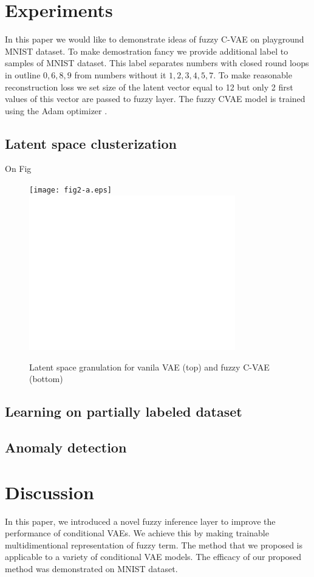 \documentclass[runningheads]{llncs}
\begin{document}
\section{Experiments}

In this paper we would like to demonstrate ideas of fuzzy C-VAE on playground MNIST dataset.
To make demostration fancy we provide additional label to samples of MNIST dataset.
This label separates numbers with closed round loops in outline $0,6,8,9$ from numbers without it $1,2,3,4,5,7$.
To make reasonable reconstruction loss we set size of the latent vector equal to 12 but only 2 first values of this vector are passed to fuzzy layer.
The fuzzy CVAE model is trained using the Adam optimizer \cite{kingma2017adam}.

\subsection{Latent space clusterization}

On Fig 

\begin{figure}[h]  
    \centering
    \texttt{[image: fig2-a.eps]}
    \includegraphics[width=0.8\textwidth]{fig2-b.eps}
    \caption{Latent space granulation for vanila VAE (top) and fuzzy C-VAE (bottom)}
    \label{fig:clustering}
\end{figure}
\subsection{Learning on partially labeled dataset}

\subsection{Anomaly detection}

\section{Discussion}

In this paper, we introduced a novel fuzzy inference layer to improve the performance of conditional VAEs. 
We achieve this by making trainable multidimentional representation of fuzzy term.
The method that we proposed is applicable to a variety of conditional VAE models. 
The efficacy of our proposed method was demonstrated on MNIST dataset. 



\end{document}
